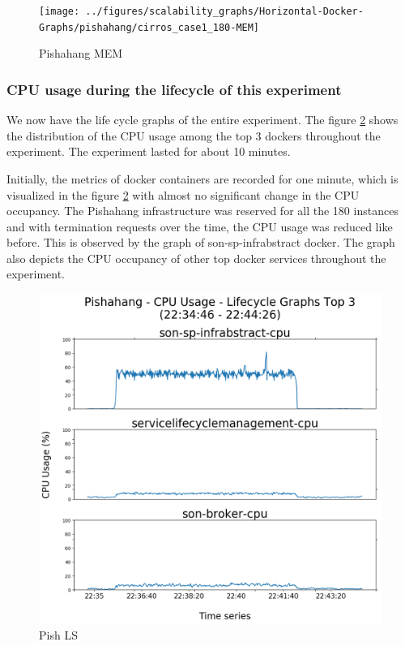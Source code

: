 \begin{figure}[h]
	\centering
	\texttt{[image: ../figures/scalability\_graphs/Horizontal-Docker-Graphs/pishahang/cirros\_case1\_180-MEM]}
	\caption{Pishahang MEM}
	\label{fig:pishcirroscase1180-mem}
\end{figure}
\pagebreak

\subsubsection{CPU usage during the lifecycle of this experiment}

We now have the life cycle graphs of the entire experiment. The figure \ref{fig:pishahang-top-3-lifecycle} shows the distribution of the CPU usage among the top 3 dockers throughout the experiment. The experiment lasted for about 10 minutes.

Initially, the metrics of docker containers are recorded for one minute, which is visualized in  the figure \ref{fig:pishahang-top-3-lifecycle} with almost no significant change in the CPU occupancy. The Pishahang infrastructure was reserved for all the 180 instances and with termination requests over the time, the CPU usage was reduced like before. This is observed by the graph of son-sp-infrabstract docker. The graph also depicts the CPU occupancy of other top docker services throughout the experiment.


\begin{figure}[h]
	\centering
	\includegraphics[width=1\linewidth]{figures/scalability_graphs/Lifecycle-Graphs-Top-3/Pishahang-TOP-3-Lifecycle}
	\caption{Pish LS}
	\label{fig:pishahang-top-3-lifecycle}
\end{figure}
